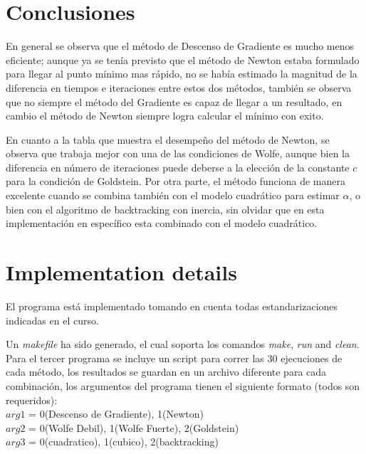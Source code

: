 \documentclass[10pt,journal,compsoc]{styles/IEEEtran}
\begin{document}
\section{Conclusiones}

En general se observa que el m\'etodo de Descenso de Gradiente es mucho menos eficiente; aunque ya se ten\'ia previsto que el m\'etodo de Newton estaba formulado para llegar al punto m\'inimo mas r\'apido, no se hab\'ia estimado la magnitud de la diferencia en tiempos e iteraciones entre estos dos m\'etodos, tambi\'en se observa que no siempre el m\'etodo del Gradiente es capaz de llegar a un resultado, en cambio el m\'etodo de Newton siempre logra calcular el m\'inimo con exito.

En cuanto a la tabla que muestra el desempe\~no del m\'etodo de Newton, se observa que trabaja mejor con una de las condiciones de Wolfe, aunque bien la diferencia en n\'umero de iteraciones puede deberse a la elecci\'on de la constante $c$ para la condici\'on de Goldstein. Por otra parte, el m\'etodo funciona de manera excelente cuando se combina tambi\'en con el modelo cuadr\'atico para estimar $\alpha$, o bien con el algoritmo de backtracking con inercia, sin olvidar que en esta implementaci\'on en espec\'ifico esta combinado con el modelo cuadr\'atico.





\appendix
\section{Implementation details}
El programa est\'a implementado tomando en cuenta todas estandarizaciones indicadas en el curso.

Un \textit{makefile} ha sido generado, el cual soporta los comandos \textit{make}, \textit{run} and \textit{clean}. Para el tercer programa se incluye un script para correr las 30 ejecuciones de cada m\'etodo, los resultados se guardan en un archivo diferente para cada combinaci\'on, los argumentos del programa tienen el siguiente formato (todos son requeridos):\\

$arg1$ = 0(Descenso de Gradiente), 1(Newton)\\
$arg2$ = 0(Wolfe Debil), 1(Wolfe Fuerte), 2(Goldstein)\\
$arg3$ = 0(cuadratico), 1(cubico), 2(backtracking)\\
\end{document}
